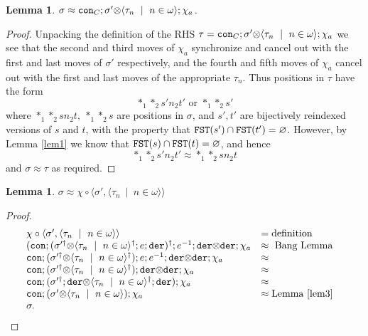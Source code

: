 \documentclass[11pt]{article}
\newtheorem{lemma}[theorem]{Lemma}
\newcommand{\tensor}{\mbox{$\otimes$}}
\newcommand{\varempty}{\varnothing}
\newcommand{\lang}{\langle}
\newcommand{\rang}{\rangle}
\begin{document}
\begin{lemma}\label{lem3}
$\sigma\approx{\tt con}_C;\sigma'\tensor \lang\tau_n\ \mid \  n\in\omega\rang ;\chi_a$.
\end{lemma}
\begin{proof} Unpacking the definition of the RHS $\tau={\tt
con}_C;\sigma'\tensor \lang\tau_n\ \mid \  n\in\omega\rang
;\chi_a$ we see that the second and third moves of $\chi_a$
synchronize and cancel out with the first and last moves of
$\sigma'$ respectively, and the fourth and fifth moves of $\chi_a$
cancel out with the first and last moves of the appropriate
$\tau_n$. Thus positions in $\tau$ have the form $$ *_1 *_2 s' n_2
t' \mbox{ or } *_1 *_2 s'$$ where $*_1 *_2 s n_2 t,\  *_1 *_2 s$
are positions in $\sigma$, and $s',t'$ are bijectively reindexed
versions of $s$ and $t$, with the property that ${\tt FST}(s')\cap
{\tt FST}(t')=\varempty$. However, by Lemma \ref{lem1} we know
that ${\tt FST}(s)\cap {\tt FST}(t)=\varempty$, and hence $$ *_1
*_2 s' n_2 t' \approx  *_1 *_2 s n_2 t $$ and $\sigma\approx\tau$
as required.
\end{proof}

\begin{lemma}\label{lem4}
$\sigma\approx\chi\circ \lang\sigma',\lang\tau_n\ \mid \  n\in\omega\rang \rang $
\end{lemma}
\begin{proof}
\[ \begin{array}[]{llc}
\chi\circ\lang\sigma',\lang\tau_n\ \mid \  n\in\omega\rang \rang  & ={\mbox{definition}}& \\
({\tt con};(\sigma'^{\dag}\tensor \lang\tau_n\ \mid \
n\in\omega\rang^{\dag};e;{\tt der})^{\dag};e^{-1};{\tt der}\tensor{\tt der};\chi_a
&\approx {\mbox{ Bang Lemma}}& \\
{\tt con};(\sigma'^{\dag}\tensor \lang\tau_n\ \mid \
n\in\omega\rang^{\dag});e;e^{-1};{\tt der}\tensor{\tt der};\chi_a &\approx&
\\
{\tt con};(\sigma'^{\dag}\tensor \lang\tau_n\ \mid \
n\in\omega\rang^{\dag});{\tt der}\tensor{\tt der} ;\chi_a &\approx
&\\ {\tt con};(\sigma'^{\dag};{\tt der}\tensor \lang\tau_n\ \mid \
n\in\omega\rang^{\dag};{\tt der});\chi_a &\approx &\\ {\tt
con};(\sigma' \tensor \lang\tau_n\ \mid \  n\in\omega\rang
);\chi_a &\approx {\mbox{Lemma \ref{lem3}}} &\\ \sigma. &&
\end{array}
\]
\end{proof}
\end{document}
